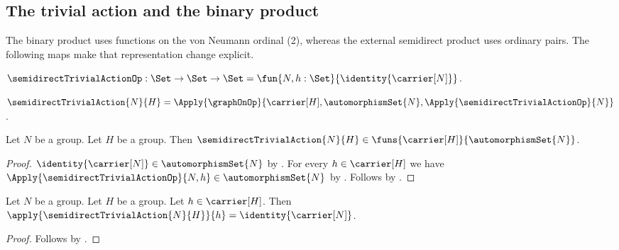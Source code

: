 \subsection{The trivial action and the binary product}

The binary product uses functions on the von Neumann ordinal (2), whereas
the external semidirect product uses ordinary pairs.  The following maps make
that representation change explicit.

\begin{definition}\label{semidirect_trivial_action_op}
    $\semidirectTrivialActionOp:\Set\to\Set\to\Set
        =\fun{N,h:\Set}{\identity{\carrier[N]}}$.
\end{definition}

\begin{definition}\label{semidirect_trivial_action}
    $\semidirectTrivialAction{N}{H}=
        \Apply{\graphOnOp}
            {\carrier[H],\automorphismSet{N},
             \Apply{\semidirectTrivialActionOp}{N}}$.
\end{definition}

\begin{proposition}\label{semidirect_trivial_action_type}
    Let $N$ be a group.
    Let $H$ be a group.
    Then $\semidirectTrivialAction{N}{H}\in
        \funs{\carrier[H]}{\automorphismSet{N}}$.
\end{proposition}
\begin{proof}
    $\identity{\carrier[N]}\in\automorphismSet{N}$ by
        .
    For every $h\in\carrier[H]$ we have
        $\Apply{\semidirectTrivialActionOp}{N,h}\in
            \automorphismSet{N}$ by
        .
    Follows by
        .
\end{proof}

\begin{proposition}\label{semidirect_trivial_action_apply}
    Let $N$ be a group.
    Let $H$ be a group.
    Let $h\in\carrier[H]$.
    Then
        $\apply{\semidirectTrivialAction{N}{H}}{h}=
            \identity{\carrier[N]}$.
\end{proposition}
\begin{proof}
    Follows by
        .
\end{proof}

